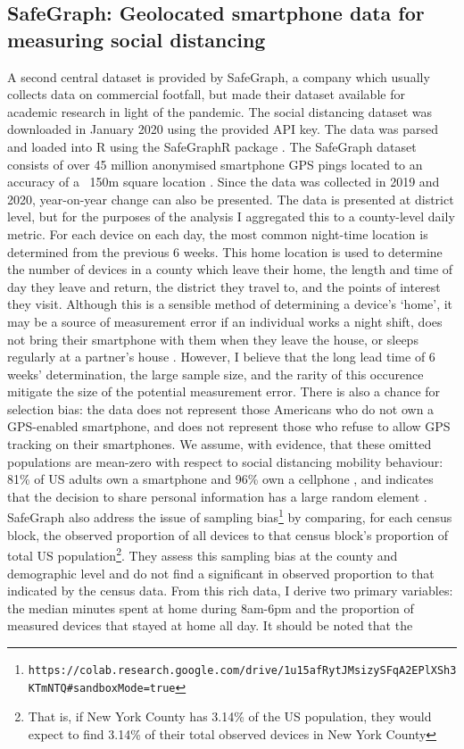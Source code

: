 \documentclass{article}
\begin{document}
\subsection{SafeGraph: Geolocated smartphone data for measuring social distancing}
A second central dataset is provided by SafeGraph, a company which usually collects data on commercial footfall, but made their dataset available for academic research in light of the pandemic. The social distancing dataset was downloaded in January 2020 using the provided API key. The data was parsed and loaded into R using the SafeGraphR package \parencite{huntington-kleinSafeGraphR2020}. The SafeGraph dataset consists of over 45 million anonymised smartphone GPS pings located to an accuracy of a ~150m square location \parencite{safegraphinc.SocialDistancingMetrics2020}. Since the data was collected in 2019 and 2020, year-on-year change can also be presented. The data is presented at district level, but for the purposes of the analysis I aggregated this to a county-level daily metric. For each device on each day, the most common night-time location is determined from the previous 6 weeks. This home location is used to determine the number of devices in a county which leave their home, the length and time of day they leave and return, the district they travel to, and the points of interest they visit. Although this is a sensible method of determining a device's `home', it may be a source of measurement error if an individual works a night shift, does not bring their smartphone with them when they leave the house, or sleeps regularly at a partner's house \parencite{chiouSocialDistancingInternet2020}. However, I believe that the long lead time of 6 weeks' determination, the large sample size, and the rarity of this occurence mitigate the size of the potential measurement error. There is also a chance for selection bias: the data does not represent those Americans who do not own a GPS-enabled smartphone, and does not represent those who refuse to allow GPS tracking on their smartphones. We assume, with evidence, that these omitted populations are mean-zero with respect to social distancing mobility behaviour: 81\% of US adults own a smartphone and 96\% own a cellphone \parencite{pewresearchcenterDemographicsMobileDevice2019}, and \parencite{atheyDigitalPrivacyParadox2017} indicates that the decision to share personal information has a large random element \parencite{chiouSocialDistancingInternet2020}. SafeGraph also address the issue of sampling bias\footnote{\tt{https://colab.research.google.com/drive/1u15afRytJMsizySFqA2EPlXSh3KTmNTQ\#sandboxMode=true}} by comparing, for each census block, the observed proportion of all devices to that census block's proportion of total US population\footnote{That is, if New York County has 3.14\% of the US population, they would expect to find 3.14\% of their total observed devices in New York County}. They assess this sampling bias at the county and demographic level and do not find a significant in observed proportion to that indicated by the census data. From this rich data, I derive two primary variables: the median minutes spent at home during 8am-6pm and the proportion of measured devices that stayed at home all day.  It should be noted that the 
\end{document}
